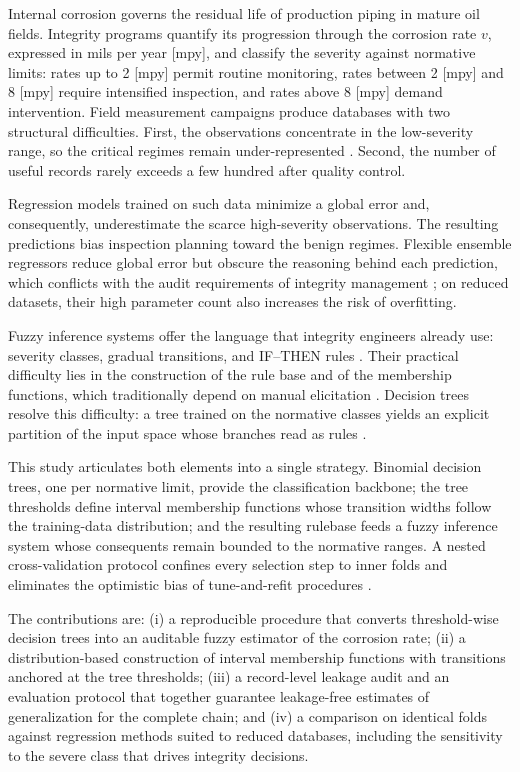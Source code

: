 Internal corrosion governs the residual life of production piping in mature oil fields. Integrity programs quantify its progression through the corrosion rate $v$, expressed in mils per year [mpy], and classify the severity against normative limits: rates up to 2 [mpy] permit routine monitoring, rates between 2 [mpy] and 8 [mpy] require intensified inspection, and rates above 8 [mpy] demand intervention. Field measurement campaigns produce databases with two structural difficulties. First, the observations concentrate in the low-severity range, so the critical regimes remain under-represented \cite{he2009imbalanced}. Second, the number of useful records rarely exceeds a few hundred after quality control.

Regression models trained on such data minimize a global error and, consequently, underestimate the scarce high-severity observations. The resulting predictions bias inspection planning toward the benign regimes. Flexible ensemble regressors reduce global error \cite{breiman2001random} but obscure the reasoning behind each prediction, which conflicts with the audit requirements of integrity management \cite{rudin2019stop}; on reduced datasets, their high parameter count also increases the risk of overfitting.

Fuzzy inference systems offer the language that integrity engineers already use: severity classes, gradual transitions, and IF--THEN rules \cite{zadeh1965fuzzy,mamdani1975experiment}. Their practical difficulty lies in the construction of the rule base and of the membership functions, which traditionally depend on manual elicitation \cite{guillaume2001designing}. Decision trees resolve this difficulty: a tree trained on the normative classes yields an explicit partition of the input space whose branches read as rules \cite{breiman1984cart}.

This study articulates both elements into a single strategy. Binomial decision trees, one per normative limit, provide the classification backbone; the tree thresholds define interval membership functions whose transition widths follow the training-data distribution; and the resulting rulebase feeds a fuzzy inference system whose consequents remain bounded to the normative ranges. A nested cross-validation protocol confines every selection step to inner folds and eliminates the optimistic bias of tune-and-refit procedures \cite{varma2006bias,cawley2010overfitting}.

The contributions are: (i) a reproducible procedure that converts threshold-wise decision trees into an auditable fuzzy estimator of the corrosion rate; (ii) a distribution-based construction of interval membership functions with transitions anchored at the tree thresholds; (iii) a record-level leakage audit and an evaluation protocol that together guarantee leakage-free estimates of generalization for the complete chain; and (iv) a comparison on identical folds against regression methods suited to reduced databases, including the sensitivity to the severe class that drives integrity decisions.